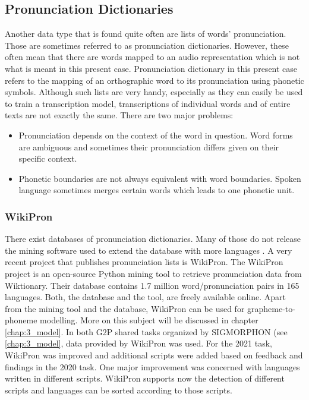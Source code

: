 \subsection{Pronunciation Dictionaries}
Another data type that is found quite often are lists of words' pronunciation. Those are sometimes referred to as pronunciation dictionaries. However, these often mean that there are words mapped to an audio representation which is not what is meant in this present case. Pronunciation dictionary in this present case refers to the mapping of an orthographic word to its pronunciation using phonetic symbols. Although such lists are very handy, especially as they can easily be used to train a transcription model, transcriptions of individual words and of entire texts are not exactly the same. There are two major problems:

\begin{itemize}
\item Pronunciation depends on the context of the word in question. Word forms are ambiguous and sometimes their pronunciation differs given on their specific context.  
\item Phonetic boundaries are not always equivalent with word boundaries. Spoken language sometimes merges certain words which leads to one phonetic unit. 
\end{itemize} 


\subsubsection*{WikiPron}
There exist databases of pronunciation dictionaries. Many of those do not release the mining software used to extend the database with more languages \citep{Lee&Ashby.2020}. A very recent project that publishes pronunciation lists is WikiPron. The WikiPron project \citep{Lee&Ashby.2020} is an open-source Python mining tool to retrieve pronunciation data from Wiktionary. Their database contains 1.7 million word/pronunciation pairs in 165 languages. Both, the database and the tool, are freely available online. Apart from the mining tool and the database, WikiPron can be used for grapheme-to-phoneme modelling. More on this subject will be discussed in chapter \ref{chap:3_model}.
In both G2P shared tasks organized by SIGMORPHON (see \ref{chap:3_model}, data provided by WikiPron was used. For the 2021 task, WikiPron was improved and additional scripts were added based on feedback and findings in the 2020 task. One major improvement was concerned with languages written in different scripts. WikiPron supports now the detection of different scripts and languages can be sorted according to those scripts.


